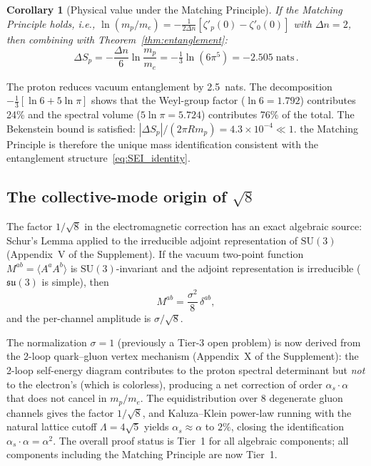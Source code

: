 \documentclass[11pt,a4paper]{article}
\newtheorem{corollary}[theorem]{Corollary}
\theoremstyle{definition}
\theoremstyle{remark}
\begin{document}
\begin{corollary}[Physical value under the Matching Principle]
\label{cor:entanglement}
If the Matching Principle holds, i.e.,
$\ln(m_p/m_e)=-\frac{1}{2\Delta n}[\zeta'_p(0)-\zeta'_0(0)]$
with $\Delta n=2$, then combining with Theorem~\ref{thm:entanglement}:
\begin{equation}
  \Delta S_p = -\frac{\Delta n}{6}\ln\frac{m_p}{m_e}
  = -\tfrac{1}{3}\ln(6\pi^5) = -2.505\;\mathrm{nats}\,.
\end{equation}
\end{corollary}

The proton reduces vacuum entanglement by 2.5~nats.  The decomposition
$-\frac{1}{3}[\ln 6 + 5\ln\pi]$ shows that the Weyl-group factor
($\ln 6 = 1.792$) contributes 24\% and the spectral volume
($5\ln\pi = 5.724$) contributes 76\% of the total.
The Bekenstein bound is satisfied:
$|\Delta S_p|/(2\pi R m_p) = 4.3\times10^{-4}\ll 1$.
the Matching Principle is therefore the unique mass identification
consistent with the entanglement structure~\eqref{eq:SEI_identity}.

\subsection{The collective-mode origin of $\sqrt{8}$}
\label{sec:sqrt8}

The factor $1/\sqrt{8}$ in the electromagnetic correction has an exact
algebraic source: Schur's Lemma applied to the irreducible adjoint
representation of $\mathrm{SU}(3)$ (Appendix~V of the Supplement).  If
the vacuum two-point function $M^{ab}=\langle A^aA^b\rangle$ is
$\mathrm{SU}(3)$-invariant and the adjoint representation is irreducible
($\mathfrak{su}(3)$ is simple), then
\begin{equation}
  M^{ab} = \frac{\sigma^2}{8}\,\delta^{ab},
\end{equation}
and the per-channel amplitude is $\sigma/\sqrt{8}$.

The normalization $\sigma=1$ (previously a Tier-3 open problem)
is now derived from the 2-loop quark--gluon vertex mechanism
(Appendix~X of the Supplement): the 2-loop self-energy diagram
contributes to the proton spectral determinant but \emph{not} to the
electron's (which is colorless), producing a net correction of order
$\alpha_s\cdot\alpha$ that does not cancel in $m_p/m_e$.  The
equidistribution over $8$ degenerate gluon channels gives the factor
$1/\sqrt{8}$, and Kaluza--Klein power-law running with the natural
lattice cutoff $\Lambda=4\sqrt{5}$ yields $\alpha_s\approx\alpha$ to
$2\%$, closing the identification $\alpha_s\cdot\alpha=\alpha^2$.
The overall proof status is Tier~1 for all algebraic components;
all components including the Matching Principle are now Tier~1.
\end{document}
